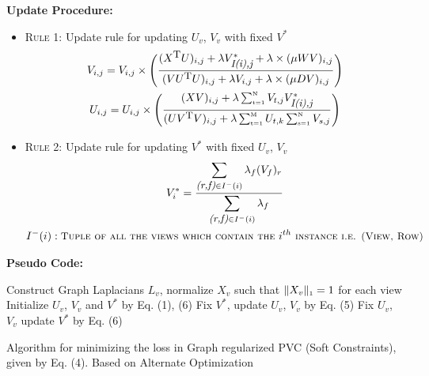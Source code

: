 \documentclass[a4paper]{article}
\begin{document}
	\noindent
	\textbf{Update Procedure:}
	\begin{itemize}
		\item \textsc{Rule 1:}	Update rule for updating $U_{v}$, ${V_{v}}$ with fixed $V^{*}$ 
			\begin{multline}
			V_{i,j} = V_{i,j} \times \Bigg( \frac{(X^{\text{\small{T}}}U)_{i,j}+\lambda V^{*}_{{\textit{\small{I(i),j}}}} +\lambda \times (\mu WV)_{i,j}}{(V U^{\text{\small{T}}} U)_{i,j} + \lambda V_{i,j} +\lambda \times (\mu DV)_{i,j}} \Bigg) \\
			U_{i,j} = U_{i,j} \times \Bigg( \frac{(XV)_{i,j}
			+ \lambda  \sum_{\text{\tiny{t=1}}}^{\text{\tiny{N}}} 
			V_{t,j}V^{*}_\textit{\small{I(i),j}}}
			{(U V^{\text{\small{T}}} V)_{i,j} 
			+ \lambda \sum_{\text{\tiny{t=1}}}^{\text{\tiny{M}}} U_{t,k} 
			\sum_{\text{\tiny{s=1}}}^{\text{\tiny{N}}}V_{s,j}} \Bigg)
			\end{multline}
		\item \textsc{Rule 2:}	Update rule for updating $V^{*}$ with fixed $U_{v}$, ${V_{v}}$ 
			\begin{multline}
			V_{i}^{*} = \frac
			{\displaystyle \sum_{\textit{\small{(r,f)}} \in I^{-}(i)} \lambda_{f} (V_{f})_{r}}
			{\displaystyle \sum_{\textit{\small{(r,f)}} \in I^{-}(i)} \lambda_{f} }\\
			 I^{-}(i) : 
			\textsc{\small{Tuple of all the views which contain the }} i^{th} {\textsc{\small{ instance i.e. (View, Row)}}}
			\end{multline}
	\end{itemize}		
	
	\noindent
	\textbf{Pseudo Code:}	
	\begin{algorithm}
		Construct Graph Laplacians $L_{v}$, normalize $X_{v}$ such that $\|X_{v}\|_{\text{\tiny1}} = 1 $ for each view\;
		Initialize  $U_{v}$, $V_{v}$ and $V^{*}$ by Eq. (1), (6)\;
		{
			{
				{
					Fix $V^{*}$, update $U_{v}$, $V_{v}$ by Eq. (5)\;
				}
			}
			Fix $U_{v}$, $V_{v}$ update $V^{*}$ by Eq. (6)\;		
		}						
		\caption{Algorithm for minimizing the loss in Graph regularized PVC (Soft Constraints), given by Eq. (4). Based on Alternate Optimization}
	\end{algorithm}
\end{document}
